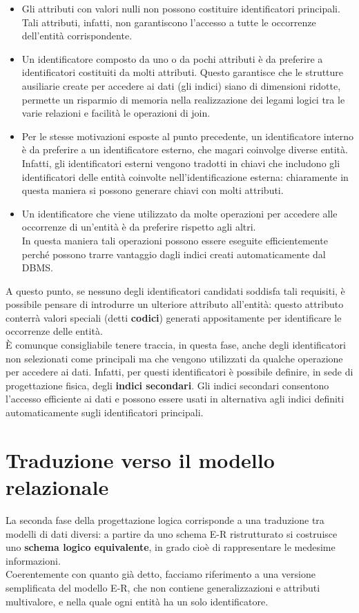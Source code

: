     \begin{itemize}
        \item{Gli attributi con valori nulli non possono costituire identificatori principali. Tali attributi, infatti, non garantiscono l'accesso a tutte le occorrenze dell'entità corrispondente.}
        \item{Un identificatore composto da uno o da pochi attributi è da preferire a identificatori costituiti da molti attributi. Questo garantisce che le strutture ausiliarie create per accedere ai dati (gli indici) siano di dimensioni ridotte, permette un risparmio di memoria nella realizzazione dei legami logici tra le varie relazioni e facilità le operazioni di join.}
        \item{Per le stesse motivazioni esposte al punto precedente, un identificatore interno è da preferire a un identificatore esterno, che magari coinvolge diverse entità.\\
        Infatti, gli identificatori esterni vengono tradotti in chiavi che includono gli identificatori delle entità coinvolte nell'identificazione esterna: chiaramente in questa maniera si possono generare chiavi con molti attributi.}
        \item{Un identificatore che viene utilizzato da molte operazioni per accedere alle occorrenze di un'entità è da preferire rispetto agli altri.\\
        In questa maniera tali operazioni possono essere eseguite efficientemente perché possono trarre vantaggio dagli indici creati automaticamente dal DBMS.}
    \end{itemize}
A questo punto, se nessuno degli identificatori candidati soddisfa tali requisiti, è possibile pensare di introdurre un ulteriore attributo all'entità: questo attributo conterrà valori speciali (detti \textbf{codici}) generati appositamente per identificare le occorrenze delle entità.\\
È comunque consigliabile tenere traccia, in questa fase, anche degli identificatori non selezionati come principali ma che vengono utilizzati da qualche operazione per accedere ai dati. Infatti, per questi identificatori è possibile definire, in sede di progettazione fisica, degli \textbf{indici secondari}. Gli indici secondari consentono l'accesso efficiente ai dati e possono essere usati in alternativa agli indici definiti automaticamente sugli identificatori principali. 

\section{Traduzione verso il modello relazionale}
La seconda fase della progettazione logica corrisponde a una traduzione tra modelli di dati diversi: a partire da uno schema E-R ristrutturato si costruisce uno \textbf{schema logico equivalente}, in grado cioè di rappresentare le medesime informazioni.\\
Coerentemente con quanto già detto, facciamo riferimento a una versione semplificata del modello E-R, che non contiene generalizzazioni e attributi multivalore, e nella quale ogni entità ha un solo identificatore. 

